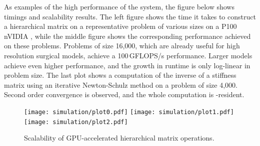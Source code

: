 %


%

As examples of the high performance of the system, the figure below shows  timings and scalability results. The left figure shows the time it takes to construct a hierarchical matrix on a representative problem of various sizes on a P100 nVIDIA , while the middle figure shows the corresponding performance achieved on these problems. Problems of size 16,000, which are already useful for high resolution surgical models, achieve a 100\,GFLOPS/s performance. Larger models achieve even higher performance, and the growth in runtime is only log-linear in problem size. The last plot shows a computation of the inverse of a stiffness matrix using an iterative Newton-Schulz method on a problem of size 4,000. Second order convergence is observed, and the whole computation is -resident.

\begin{figure}
  \centering%
  \texttt{[image: simulation/plot0.pdf]}
  \hfill%
  \texttt{[image: simulation/plot1.pdf]}
  \hfill%
  \texttt{[image: simulation/plot2.pdf]}
  \vspace{-15ex}
  \caption{Scalability of GPU-accelerated hierarchical matrix operations.}\label{fig:plots}
\end{figure}

